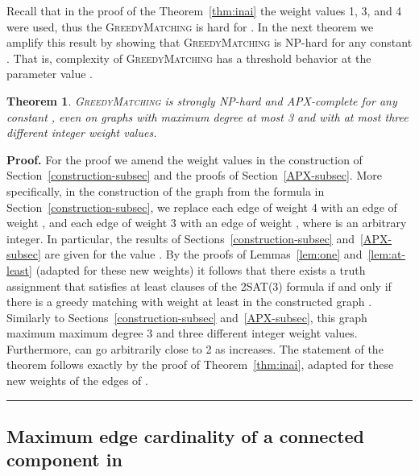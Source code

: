 \documentclass[a4paper,11pt]{article}
\newtheorem{theorem}{Theorem}
\newenvironment{proof}[1][Proof]{\noindent\textbf{#1.} }{\ \rule{0.5em}{0.5em}}
\newcommand{\greedy}{\textsc{GreedyMatching}\xspace}
\begin{document}
\medskip

Recall that in the proof of the Theorem~\ref{thm:inai} the weight values 1,
3, and 4 were used, thus the \greedy is hard for . In the next theorem we amplify this result by showing
that \greedy is NP-hard for any
constant . That is, complexity of \greedy has a threshold behavior at the parameter value .

\begin{theorem}
\label{thm:parlb} \greedy is \emph{strongly NP-hard} and \emph{APX-complete} 
for any constant , even on graphs with maximum degree at most 3 and with at most three different integer weight values.
\end{theorem}

\begin{proof}
For the proof we amend the weight values in the construction of Section~\ref{construction-subsec} 
and the proofs of Section~\ref{APX-subsec}. 
More specifically, in the construction of the graph  from the formula  
in Section~\ref{construction-subsec}, we replace each edge of weight 4 with
an edge of weight , and each edge of weight 3 with an edge of weight , 
where  is an arbitrary integer. In particular, the results of
Sections~\ref{construction-subsec} and~\ref{APX-subsec} are given for the value . 
By the proofs of Lemmas~\ref{lem:one} and~\ref{lem:at-least} 
(adapted for these new weights) it follows that there exists
a truth assignment that satisfies at least  clauses of the 2SAT(3)
formula  if and only if there is a greedy matching with weight at least  in the constructed graph . 
Similarly to Sections~\ref{construction-subsec} and~\ref{APX-subsec}, 
this graph  maximum maximum degree 3 and three different integer weight values. 
Furthermore,  can go arbitrarily close to 2 as  increases. 
The statement of the theorem follows exactly by the proof of Theorem~\ref{thm:inai}, adapted for these new weights of the edges of .
\end{proof}






\subsection{Maximum edge cardinality of a connected component in \label{sec:param2}}
\end{document}
